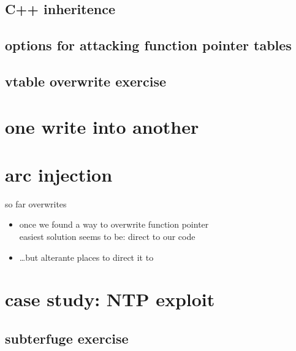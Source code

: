 \subsection{C++ inheritence}


\subsection{options for attacking function pointer tables}


\subsection{vtable overwrite exercise}





\section{one write into another}


\section{arc injection}
\begin{frame}{so far overwrites}
    \begin{itemize}
    \item once we found a way to overwrite function pointer\\
          easiest solution seems to be: direct to our code
    \item \ldots but alterante places to direct it to
    \end{itemize}
\end{frame}



\section{case study: NTP exploit}


\subsection{subterfuge exercise}

